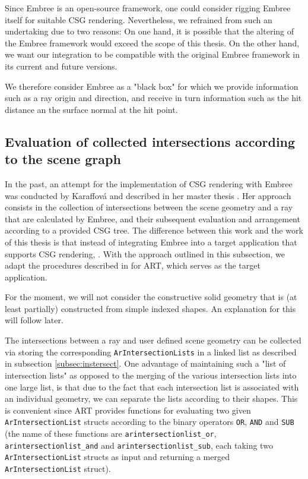 Since Embree is an open-source framework, one could consider rigging Embree itself for suitable CSG rendering. Nevertheless, we refrained from such an undertaking due to two reasons: On one hand, it is possible that the altering of the Embree framework would exceed the scope of this thesis. On the other hand, we want our integration to be compatible with the original Embree framework in its current and future versions. 

We therefore consider Embree as a "black box" for which we provide information such as a ray origin and direction, and receive in turn information such as the hit distance an the surface normal at the hit point.


\subsection{Evaluation of collected intersections according to the scene graph}
\label{subsec:apprach1}

In the past, an attempt for the implementation of CSG rendering with Embree was conducted by Karaffová and described in her master thesis \cite{karaffova2016}. Her approach consists in the collection of intersections between the scene geometry and a ray that are calculated by Embree, and their subsequent evaluation and arrangement according to a provided CSG tree. The difference between this work and the work of this thesis is that instead of integrating Embree into a target application that supports CSG rendering,  .
With the approach outlined in this subsection, we adapt the procedures described in \cite{karaffova2016} for ART, which serves as the target application. 

For the moment, we will not consider the constructive solid geometry that is (at least partially) constructed from simple indexed shapes. An explanation for this will follow later.

The intersections between a ray and user defined scene geometry can be collected via storing the corresponding \texttt{ArIntersectionLists} in a linked list as described in subsection \ref{subsec:instersect}. One advantage of maintaining such a "list of intersection lists" as opposed to the merging of the various intersection lists into one large list, is that due to the fact that each intersection list is associated with an individual geometry, we can separate the lists according to their shapes. This is convenient since ART provides functions for evaluating two given \texttt{ArIntersectionList} structs according to the binary operators \texttt{OR}, \texttt{AND} and \texttt{SUB} (the name of these functions are \texttt{arintersectionlist\_or}, \texttt{arintersectionlist\_and} and \texttt{arintersectionlist\_sub}, each taking two \texttt{ArIntersectionList} structs as input and returning a merged \texttt{ArIntersectionList} struct).

